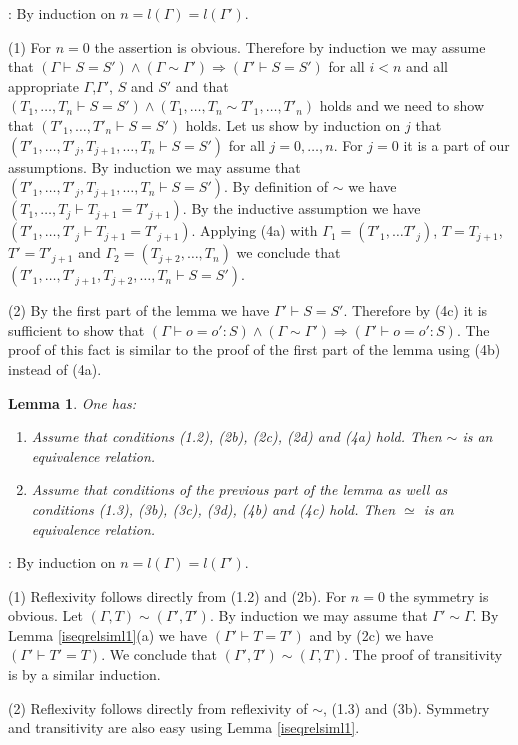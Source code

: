\documentclass[11pt]{article}
\newenvironment{proof}{{\bf Proof}:}{\vskip 5mm }
\newtheorem{lemma}[proposition]{Lemma}
\newcommand{\llabel}[1]{\label{#1}}
\newcommand{\impl}{{\Rightarrow}}
\begin{document}
\begin{proof}
By induction on $n=l(\Gamma)=l(\Gamma')$.

(1) For $n=0$ the assertion is obvious. Therefore by induction we may assume that $(\Gamma\vdash S=S')\wedge(\Gamma\sim\Gamma')\impl (\Gamma'\vdash S=S')$ for all $i<n$ and all appropriate $\Gamma$,$\Gamma'$, $S$ and $S'$ and that $(T_1,\dots,T_n\vdash S=S')\wedge(T_1,\dots,T_n\sim T'_1,\dots,T'_n)$ holds and we need to show that $(T'_1,\dots,T'_n\vdash S=S')$ holds. Let us show by induction on $j$ that $(T'_1,\dots,T'_j,T_{j+1},\dots,T_n\vdash S=S')$ for all $j=0,\dots,n$. For $j=0$ it is a part of our assumptions. By induction we may assume that $(T'_1,\dots,T'_j,T_{j+1},\dots,T_n\vdash S=S')$. By definition of $\sim$ we have $(T_1,\dots,T_j\vdash T_{j+1}=T'_{j+1})$. By the inductive assumption we have $(T'_1,\dots,T'_j\vdash T_{j+1}=T'_{j+1})$. Applying (4a) with $\Gamma_1=(T'_1,\dots T'_j)$, $T=T_{j+1}$, $T'=T'_{j+1}$ and $\Gamma_2=(T_{j+2},\dots,T_n)$ we conclude that $(T'_1,\dots,T'_{j+1},T_{j+2},\dots,T_n\vdash S=S')$.

(2)  By the first part of the lemma we have $\Gamma'\vdash S=S'$. Therefore by (4c) it is sufficient to show that $(\Gamma\vdash o=o':S)\wedge(\Gamma\sim\Gamma')\impl (\Gamma'\vdash o=o':S)$. The proof of this fact is similar to the proof of the first part of the lemma using (4b) instead of (4a).  
\end{proof}
%
\begin{lemma}
\llabel{iseqrelsim}
One has:
%
\begin{enumerate}
\item Assume that conditions (1.2), (2b), (2c), (2d) and (4a) hold. Then $\sim$ is an equivalence relation.
\item Assume that conditions of the previous part of the lemma as well as conditions (1.3), (3b), (3c), (3d), (4b) and (4c) hold. Then $\simeq$ is an equivalence relation. 
\end{enumerate}
\end{lemma}
%
\begin{proof}
By induction on $n=l(\Gamma)=l(\Gamma')$. 

(1) Reflexivity follows directly from (1.2) and (2b). For $n=0$ the symmetry is obvious. Let $(\Gamma,T)\sim(\Gamma',T')$. By induction we may assume that $\Gamma'\sim\Gamma$. By Lemma \ref{iseqrelsiml1}(a) we have $(\Gamma'\vdash T=T')$ and by (2c) we have $(\Gamma'\vdash T'=T)$. We conclude that $(\Gamma',T')\sim(\Gamma,T)$.  The proof of transitivity is by a similar induction.

(2) Reflexivity follows directly from  reflexivity of $\sim$, (1.3) and (3b). Symmetry and transitivity are also easy using Lemma \ref{iseqrelsiml1}.
\end{proof}
\end{document}
